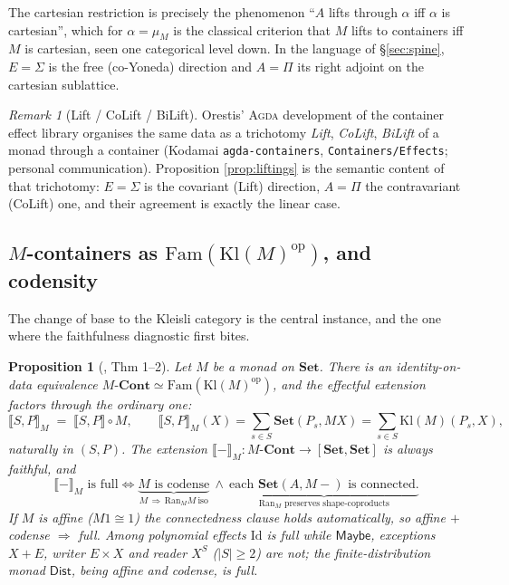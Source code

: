 \documentclass[11pt]{amsart}
\theoremstyle{plain}
\newtheorem{proposition}[theorem]{Proposition}
\theoremstyle{definition}
\theoremstyle{remark}
\newtheorem{remark}[theorem]{Remark}
\newcommand{\Set}{\mathbf{Set}}
\newcommand{\Cont}{\mathbf{Cont}}
\newcommand{\Fam}{\mathrm{Fam}}
\newcommand{\Kl}{\mathrm{Kl}}
\newcommand{\Ran}{\mathrm{Ran}}
\newcommand{\op}{\mathrm{op}}
\newcommand{\ext}[1]{\llbracket #1 \rrbracket}
\newcommand{\extM}[1]{\llbracket #1 \rrbracket_{M}}
\newcommand{\Id}{\mathrm{Id}}
\newcommand{\Maybe}{\mathsf{Maybe}}
\newcommand{\Dist}{\mathsf{Dist}}
\begin{document}
The cartesian restriction is precisely the phenomenon ``$A$ lifts through $\alpha$ iff $\alpha$ is
cartesian'', which for $\alpha=\mu_M$ is the classical criterion that $M$ lifts to containers iff $M$
is cartesian, seen one categorical level down. In the language of \S\ref{sec:spine}, $E=\Sigma$ is the
free (co-Yoneda) direction and $A=\Pi$ its right adjoint on the cartesian sublattice.

\begin{remark}[Lift / CoLift / BiLift]
Orestis' \textsc{Agda} development of the container effect library organises the same data as a
trichotomy \emph{Lift}, \emph{CoLift}, \emph{BiLift} of a monad through a container (Kodamai
\texttt{agda-containers}, \texttt{Containers/Effects}; personal communication). Proposition
\ref{prop:liftings} is the semantic content of that trichotomy: $E=\Sigma$ is the covariant (Lift)
direction, $A=\Pi$ the contravariant (CoLift) one, and their agreement is exactly the linear case.
\end{remark}

\subsection{$M$-containers as $\Fam(\Kl(M)^{\op})$, and codensity}\label{ssec:mcont}
The change of base to the Kleisli category is the central instance, and the one where the faithfulness
diagnostic first bites.

\begin{proposition}[\cite{MacBethCodensity}, Thm 1--2]\label{prop:mcont}
Let $M$ be a monad on $\Set$. There is an identity-on-data equivalence
$M\text{-}\Cont \simeq \Fam(\Kl(M)^{\op})$, and the effectful extension factors through the ordinary
one:
\[
  \extM{S,P} \;=\; \ext{S,P}\circ M,\qquad \extM{S,P}(X)=\sum_{s\in S}\Set(P_s, MX)
  =\sum_{s\in S}\Kl(M)(P_s,X),
\]
naturally in $(S,P)$. The extension $\extM{-}\colon M\text{-}\Cont\to[\Set,\Set]$ is \emph{always
faithful}, and
\[
  \extM{-}\text{ is full}\iff
  \underbrace{M\text{ is codense}}_{M\,\Rightarrow\,\Ran_M M\ \text{iso}}
  \ \wedge\
  \underbrace{\text{each }\Set(A,M-)\text{ is connected}.}_{\Ran_M\text{ preserves shape-coproducts}}
\]
If $M$ is affine ($M1\cong 1$) the connectedness clause holds automatically, so affine $+$ codense
$\Rightarrow$ full. Among polynomial effects $\Id$ is full while $\Maybe$, exceptions $X+E$, writer
$E\times X$ and reader $X^S$ ($|S|\ge2$) are not; the finite-distribution monad $\Dist$, being affine
and codense, \emph{is} full.
\end{proposition}
\end{document}

